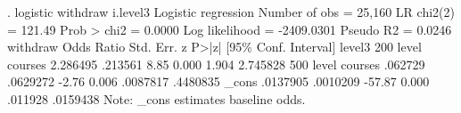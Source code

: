 . logistic withdraw i.level3
{\smallskip}
Logistic regression                             Number of obs     =     25,160
                                                LR chi2(2)        =     121.49
                                                Prob > chi2       =     0.0000
Log likelihood = -2409.0301                     Pseudo R2         =     0.0246
{\smallskip}
          withdraw {\VBAR} Odds Ratio   Std. Err.      z    P>|z|     [95\% Conf. Interval]
            level3 {\VBAR}
200 level courses  {\VBAR}   2.286495    .213561     8.85   0.000        1.904    2.745828
500 level courses  {\VBAR}    .062729   .0629272    -2.76   0.006     .0087817    .4480835
                   {\VBAR}
             _cons {\VBAR}   .0137905   .0010209   -57.87   0.000      .011928    .0159438
Note: _cons estimates baseline odds.
{\smallskip}
